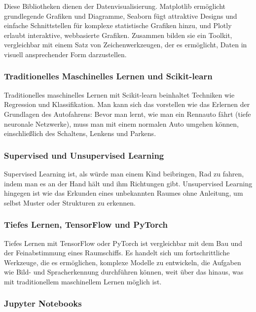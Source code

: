 \documentclass{vorlage-design-main}
\begin{document}
Diese Bibliotheken dienen der Datenvisualisierung. Matplotlib ermöglicht
grundlegende Grafiken und Diagramme, Seaborn fügt attraktive Designs und
einfache Schnittstellen für komplexe statistische Grafiken hinzu, und
Plotly erlaubt interaktive, webbasierte Grafiken. Zusammen bilden sie
ein Toolkit, vergleichbar mit einem Satz von Zeichenwerkzeugen, der es
ermöglicht, Daten in visuell ansprechender Form darzustellen.

\subsubsection{Traditionelles Maschinelles Lernen und
Scikit-learn}\label{traditionelles-maschinelles-lernen-und-scikit-learn}

Traditionelles maschinelles Lernen mit Scikit-learn beinhaltet Techniken
wie Regression und Klassifikation. Man kann sich das vorstellen wie das
Erlernen der Grundlagen des Autofahrens: Bevor man lernt, wie man ein
Rennauto fährt (tiefe neuronale Netzwerke), muss man mit einem normalen
Auto umgehen können, einschließlich des Schaltens, Lenkens und Parkens.

\subsubsection{Supervised und Unsupervised
Learning}\label{supervised-und-unsupervised-learning}

Supervised Learning ist, als würde man einem Kind beibringen, Rad zu
fahren, indem man es an der Hand hält und ihm Richtungen gibt.
Unsupervised Learning hingegen ist wie das Erkunden eines unbekannten
Raumes ohne Anleitung, um selbst Muster oder Strukturen zu erkennen.

\subsubsection{Tiefes Lernen, TensorFlow und
PyTorch}\label{tiefes-lernen-tensorflow-und-pytorch}

Tiefes Lernen mit TensorFlow oder PyTorch ist vergleichbar mit dem Bau
und der Feinabstimmung eines Raumschiffs. Es handelt sich um
fortschrittliche Werkzeuge, die es ermöglichen, komplexe Modelle zu
entwickeln, die Aufgaben wie Bild- und Spracherkennung durchführen
können, weit über das hinaus, was mit traditionellem maschinellem Lernen
möglich ist.

\subsubsection{Jupyter Notebooks}\label{jupyter-notebooks}
\end{document}
